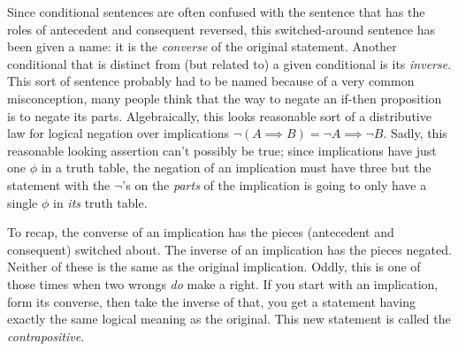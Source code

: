 \documentclass[10pt,]{book}
\theoremstyle{plain}
\theoremstyle{definition}
\theoremstyle{definition}
\numberwithin{equation}{section}
\begin{document}
    Since conditional sentences are often confused with the sentence
    that has the roles of antecedent and consequent reversed, this
    switched-around sentence has been given a name: it is the
    \emph{converse}
    of the original statement. Another conditional that is distinct from
    (but related to) a given conditional is its \emph{inverse}.
    This sort of sentence probably had to be named because of a very common
    misconception, many people think that the way to negate an if-then
    proposition is to negate
    its parts. Algebraically, this looks reasonable \textemdash{} sort of a distributive
    law for logical negation over implications \textemdash{} \({\lnot}( A \implies B) =
    {\lnot}A \implies {\lnot}B\). Sadly, this reasonable looking assertion
    can't possibly be true; since implications have just one \(\phi\) in a truth
    table, the negation of an implication must have three \textemdash{} but the statement
    with the \(\lnot\)'s on the \emph{parts} of the implication is going to only have
    a single \(\phi\) in \emph{its} truth table.
\par

    To recap, the converse of an implication has the pieces (antecedent and
    consequent) switched about. The inverse of an implication has the
    pieces negated. Neither of these is the same as the original implication.
    Oddly, this is one of those times when two wrongs \emph{do} make a right.
    If you start with an implication, form its converse, then take the inverse
    of that, you get a statement having exactly the same logical meaning
    as the original. This new statement is called the
    \emph{contrapositive}.
\par
\end{document}
